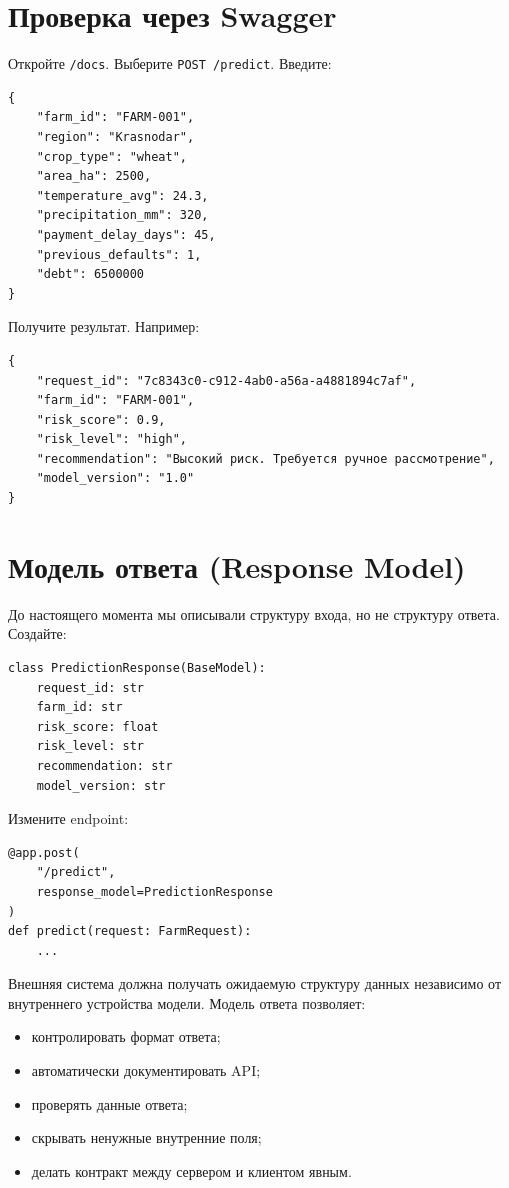 \documentclass[12pt,a4paper]{article}
\begin{document}
\section{Проверка через Swagger}

Откройте \texttt{/docs}. Выберите \texttt{POST /predict}. Введите:

\begin{lstlisting}[caption={Тестовый запрос}]
{
    "farm_id": "FARM-001",
    "region": "Krasnodar",
    "crop_type": "wheat",
    "area_ha": 2500,
    "temperature_avg": 24.3,
    "precipitation_mm": 320,
    "payment_delay_days": 45,
    "previous_defaults": 1,
    "debt": 6500000
}
\end{lstlisting}

Получите результат. Например:

\begin{lstlisting}[caption={Пример ответа}]
{
    "request_id": "7c8343c0-c912-4ab0-a56a-a4881894c7af",
    "farm_id": "FARM-001",
    "risk_score": 0.9,
    "risk_level": "high",
    "recommendation": "Высокий риск. Требуется ручное рассмотрение",
    "model_version": "1.0"
}
\end{lstlisting}

\section{Модель ответа (Response Model)}

До настоящего момента мы описывали структуру входа, но не структуру ответа. Создайте:

\begin{lstlisting}[caption={Модель PredictionResponse}]
class PredictionResponse(BaseModel):
    request_id: str
    farm_id: str
    risk_score: float
    risk_level: str
    recommendation: str
    model_version: str
\end{lstlisting}

Измените endpoint:

\begin{lstlisting}[caption={Endpoint /predict с response\_model}]
@app.post(
    "/predict",
    response_model=PredictionResponse
)
def predict(request: FarmRequest):
    ...
\end{lstlisting}

Внешняя система должна получать ожидаемую структуру данных независимо от внутреннего устройства модели. Модель ответа позволяет:

\begin{itemize}
    \item контролировать формат ответа;
    \item автоматически документировать API;
    \item проверять данные ответа;
    \item скрывать ненужные внутренние поля;
    \item делать контракт между сервером и клиентом явным.
\end{itemize}
\end{document}
